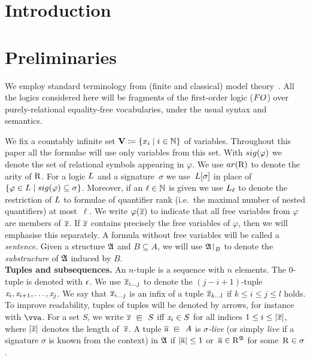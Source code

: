 \documentclass[a4paper,UKenglish,cleveref, autoref, thm-restate, hideLIPIcs]{lipics-v2021}
\begin{document}
\maketitle

\begin{abstract}
\end{abstract}

\section{Introduction}\label{sec:intro}


\section{Preliminaries}\label{sec:preliminaries}
We employ standard terminology from (finite and classical) model theory~\cite{Hodges97,Libkin04}.
All the logics considered here will be fragments of the first-order logic ($\FO$) over purely-relational equality-free vocabularies, under the usual syntax and semantics. 

We fix a countably infinite set $\mathbf{V} \coloneqq \{x_i \mid i \in {\mathbb{N}}\}$ of variables. 
Throughout this paper all the formulae will use only variables from this set.
With $\sig(\varphi)$ we denote the set of relational symbols appearing in $\varphi$. 
We use $\arity(\relR)$ to denote the arity of $\mathrm{R}$.
For a logic $\logicL$ and a signature~$\sigma$ we use~$\logicL[\sigma]$ in place of~$\{ \varphi \in \logicL \mid \sig(\varphi) \subseteq \sigma \}$.
Moreover, if an $\ell \in {\mathbb{N}}$ is given we use $\logicL_\ell$ to denote the restriction of $\logicL$ to formulae of quantifier rank (i.e.\ the maximal number of nested quantifiers) at most~$\ell$. 
We write $\varphi(\overline{\mathit{x}})$ to indicate that all free variables from $\varphi$ are members of $\overline{\mathit{x}}$. If $\overline{\mathit{x}}$ contains precisely the free
variables of $\varphi$, then we will emphasise this separately.
A formula without free variables will be called a \emph{sentence}. 
Given a structure ${\mathfrak{A}}$ and $B \subseteq A$, we will use ${\mathfrak{A}}\mathord{\upharpoonright}_{B}$ to denote the \emph{substructure} of ${\mathfrak{A}}$ induced by $B$.\\

\noindent \textbf{Tuples and subsequences.}
An $n$-tuple is a sequence with $n$ elements. The $0$-tuple is denoted with $\epsilon$.
We use $\overline{\mathit{x}}_{i\ldots j}$ to denote the $(j{-}i{+}1)$-tuple $\mathit{x}_i, \mathit{x}_{i+1}, \ldots, \mathit{x}_j$.
We say that $\overline{\mathit{x}}_{i\ldots j}$ is an infix of a tuple $\overline{\mathit{x}}_{k\ldots l}$ if $k \leq i \leq j \leq l$ holds. 
To improve readability, tuples of tuples will be denoted by arrows, for instance with $\elemtuptuplea$.
For a set $S$, we write $\vartuplex \sqin S$ iff $\mathit{x}_i \in S$ for all indices $1 \leq i \leq |\overline{\mathit{x}}|$, where $|\overline{\mathit{x}}|$ denotes the length of~$\overline{\mathit{x}}$. 
A tuple $\elemtuplea \sqin A$ is \emph{$\sigma$-live} (or simply \emph{live} if a signature $\sigma$ is known from the context) in ${\mathfrak{A}}$ if $|\overline{\mathrm{a}}| \leq 1$ or~$\overline{\mathrm{a}} \in \mathrm{R}^{{\mathfrak{A}}}$ for some~$\mathrm{R} \in \sigma$.\\
\end{document}
